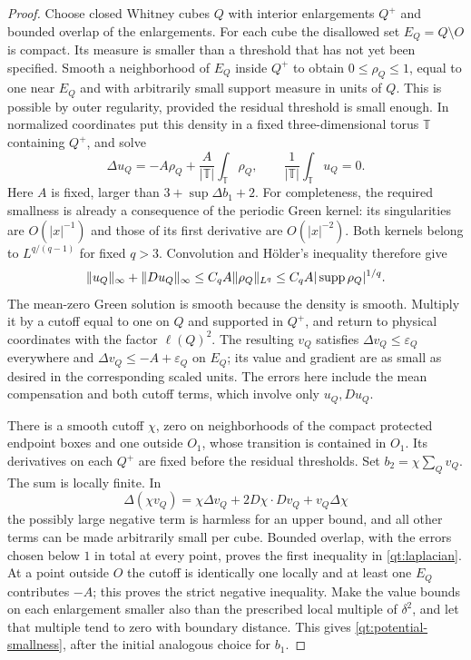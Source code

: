 \begin{proof}
Choose closed Whitney cubes $Q$ with interior enlargements $Q^+$ and
bounded overlap of the enlargements.  For each cube the disallowed set
$E_Q=Q\setminus O$ is compact.  Its measure is smaller than a threshold
that has not yet been specified.  Smooth a neighborhood of $E_Q$ inside
$Q^+$ to obtain $0\leq\rho_Q\leq1$, equal to one near $E_Q$ and with
arbitrarily small support measure in units of $Q$.  This is possible by
outer regularity, provided the residual threshold is small enough.
In normalized coordinates put this density in a fixed three-dimensional
torus $\mathbb T$ containing $Q^+$, and solve
\[
 \Delta u_Q=-A\rho_Q+
       \frac{A}{|\mathbb T|}\int_{\mathbb T}\rho_Q,\qquad
 \frac{1}{|\mathbb T|}\int_{\mathbb T}u_Q=0.
\]
Here $A$ is fixed, larger than $3+\sup\Delta b_1+2$.
For completeness, the required smallness is already a consequence of
the periodic Green kernel: its singularities are $O(|x|^{-1})$ and those
of its first derivative are $O(|x|^{-2})$.  Both kernels belong to
$L^{q/(q-1)}$ for fixed $q>3$.  Convolution and H\"older's inequality
therefore give
\[
 \|u_Q\|_\infty+\|Du_Q\|_\infty
 \leq C_q A\|\rho_Q\|_{L^q}
 \leq C_q A|\operatorname{supp}\rho_Q|^{1/q}.
\]
The mean-zero Green solution is smooth because the density is smooth.
Multiply it by a cutoff equal to one on $Q$ and supported in $Q^+$,
and return to physical coordinates with the factor $\ell(Q)^2$.
The resulting $v_Q$ satisfies $\Delta v_Q\leq\varepsilon_Q$
everywhere and $\Delta v_Q\leq-A+\varepsilon_Q$ on $E_Q$;
its value and gradient are as small as desired in the corresponding
scaled units.  The errors here include the mean compensation and both
cutoff terms, which involve only $u_Q,Du_Q$.

There is a smooth cutoff $\chi$, zero on neighborhoods of the compact
protected endpoint boxes and one outside $O_1$, whose transition is
contained in $O_1$.  Its derivatives on each $Q^+$ are fixed before the
residual thresholds.  Set $b_2=\chi\sum_Qv_Q$.  The sum is locally
finite.  In
\[
 \Delta(\chi v_Q)=\chi\Delta v_Q+2D\chi\cdot Dv_Q+v_Q\Delta\chi
\]
the possibly large negative term is harmless for an upper bound, and
all other terms can be made arbitrarily small per cube.  Bounded overlap,
with the errors chosen below $1$ in total at every point, proves the
first inequality in \eqref{qt:laplacian}.  At a point outside $O$ the
cutoff is identically one locally and at least one $E_Q$ contributes
$-A$; this proves the strict negative inequality.  Make the value bounds
on each enlargement smaller also than the prescribed local multiple of
$\delta^2$, and let that multiple tend to zero with boundary distance.
This gives \eqref{qt:potential-smallness}, after the initial analogous
choice for $b_1$.


\end{proof}
